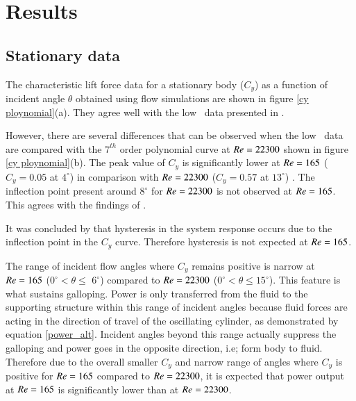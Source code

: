 \section{Results}
\label{sec:results}

\subsection{Stationary data}

The characteristic lift force data for a stationary body ($C_y$) as a function of incident angle $\theta$ obtained using flow simulations are shown in figure \ref{cy ploynomial}(a). They agree well with the low \reynoldsnumber\ data presented in \citet{Joly2012}.

However, there are several differences that can be observed when the low \reynoldsnumber\ data are compared with the $7^{th}$ order polynomial curve at $Re=22300$ shown in figure \ref{cy ploynomial}(b). The peak value of $C_y$ is  significantly lower at $Re=165$ ($C_y=0.05$ at $4^\circ$) in comparison with $Re=22300$ ($C_y=0.57$ at $13^\circ$) . The inflection point present around $8^\circ$ for $Re=22300$ is not observed at $Re=165$. This agrees with the findings of \cite{Luo2003}. 

It was concluded by \cite{Luo2003} that hysteresis in the system response occurs due to the inflection point in the $C_y$ curve. Therefore hysteresis is not expected at $Re=165$.

The range of incident flow angles where $C_y$ remains positive is narrow at $Re=165$ ($0^\circ <\theta \leq$ $6^\circ$) compared to $Re=22300$ ($0^\circ <\theta \leq 15^\circ$). This feature is what sustains galloping. Power is only transferred from the fluid to the supporting structure within this range of incident angles because fluid forces are acting in the direction of travel of the oscillating cylinder, as demonstrated by equation \ref{power_alt}. Incident angles beyond this range actually suppress the galloping and power goes in the opposite direction, i.e; form body to fluid. Therefore due to the overall smaller $C_y$ and narrow range of angles where $C_y$ is positive for $Re=165$ compared to $Re=22300$, it is expected that power output at $Re=165$ is significantly lower than at $Re=22300$. 



